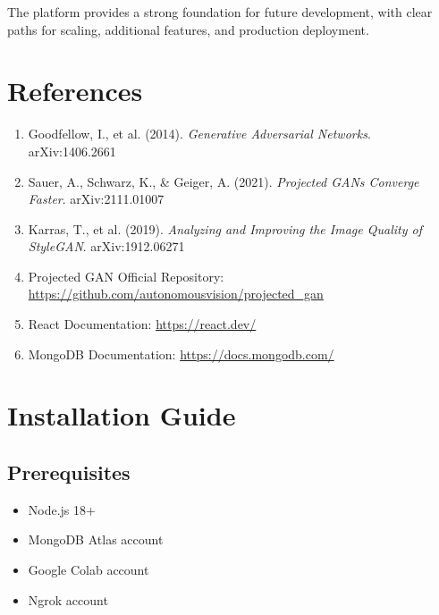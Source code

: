 \documentclass[11pt,a4paper]{article}
\begin{document}
The platform provides a strong foundation for future development, with clear paths for scaling, additional features, and production deployment.

\section*{References}

\begin{enumerate}[noitemsep]
    \item Goodfellow, I., et al. (2014). \textit{Generative Adversarial Networks}. arXiv:1406.2661
    
    \item Sauer, A., Schwarz, K., \& Geiger, A. (2021). \textit{Projected GANs Converge Faster}. arXiv:2111.01007
    
    \item Karras, T., et al. (2019). \textit{Analyzing and Improving the Image Quality of StyleGAN}. arXiv:1912.06271
    
    \item Projected GAN Official Repository: \url{https://github.com/autonomousvision/projected\_gan}
    
    \item React Documentation: \url{https://react.dev/}
    
    \item MongoDB Documentation: \url{https://docs.mongodb.com/}
\end{enumerate}

\appendix
\section{Installation Guide}

\subsection{Prerequisites}
\begin{itemize}[noitemsep]
    \item Node.js 18+
    \item MongoDB Atlas account
    \item Google Colab account
    \item Ngrok account
\end{itemize}
\end{document}
